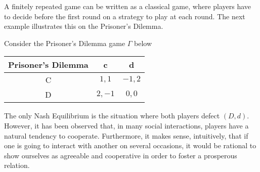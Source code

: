 A finitely repeated game can be written as a classical game, where players
have to decide before the first round on a strategy to play at each round.
The next example illustrates this on the Prisoner's Dilemma.
\begin{example}
    \label{ch9:ex:PD1}
    Consider the Prisoner's Dilemma game $\Gamma$ below
    \begin{center}
    \begin{tabular}{c|cc}
        Prisoner's Dilemma & c & d \\
        \hline
        C & $1, 1$ & $-1, 2$ \\
        D & $2, -1$ & $0, 0$
    \end{tabular}
\end{center}
The only Nash Equilibrium is the situation where both players defect
$(D,d)$. However, it has been observed that, in many social interactions,
players have a natural tendency to cooperate.
Furthermore, it makes sense, intuitively, that if one is going to interact
with another on several occasions, it would be rational to show ourselves
as agreeable and cooperative in order to foster a prosperous relation.


\end{example}
